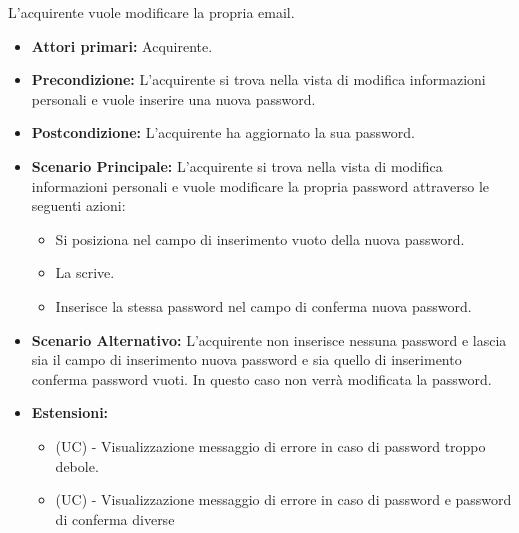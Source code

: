 L'acquirente vuole modificare la propria email.
\begin{itemize}
    \item \textbf{Attori primari:} Acquirente.
    \item \textbf{Precondizione:} L'acquirente si trova nella vista di modifica informazioni personali e vuole inserire una nuova password.
    \item \textbf{Postcondizione:} L'acquirente ha aggiornato la sua password.
    \item \textbf{Scenario Principale:} L'acquirente si trova nella vista di modifica informazioni personali e vuole modificare la propria password attraverso le seguenti azioni:
        \begin{itemize}
            \item Si posiziona nel campo di inserimento vuoto della nuova password.
            \item La scrive.
            \item Inserisce la stessa password nel campo di conferma nuova password.
        \end{itemize}
    \item \textbf{Scenario Alternativo:} L'acquirente non inserisce nessuna password e lascia sia il campo di inserimento nuova password e sia quello di inserimento conferma password vuoti. In questo caso non verrà modificata la password.
    \item \textbf{Estensioni:}
    \begin{itemize}
        \item (UC) - Visualizzazione messaggio di errore in caso di password troppo debole.
        \item (UC) - Visualizzazione messaggio di errore in caso di password e password di conferma diverse
    \end{itemize}
\end{itemize}



